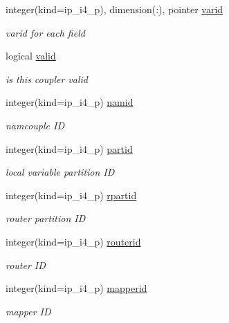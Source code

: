 \begin{DoxyCompactItemize}
integer(kind=ip\+\_\+i4\+\_\+p), dimension(\+:), pointer \hyperlink{structmod__oasis__coupler_1_1prism__coupler__type_a9e31592685ea4cb2da222187ee2ffa4b}{varid}
\begin{DoxyCompactList}\small\item\em varid for each field \end{DoxyCompactList}\item 
logical \hyperlink{structmod__oasis__coupler_1_1prism__coupler__type_aceee78ca0ec709406b404ff29e1fcf18}{valid}
\begin{DoxyCompactList}\small\item\em is this coupler valid \end{DoxyCompactList}\item 
integer(kind=ip\+\_\+i4\+\_\+p) \hyperlink{structmod__oasis__coupler_1_1prism__coupler__type_a68ccbd8305f8c1016a9025558ab8dea5}{namid}
\begin{DoxyCompactList}\small\item\em namcouple ID \end{DoxyCompactList}\item 
integer(kind=ip\+\_\+i4\+\_\+p) \hyperlink{structmod__oasis__coupler_1_1prism__coupler__type_a5506dc46a0c8def7417a6e2a9c046474}{partid}
\begin{DoxyCompactList}\small\item\em local variable partition ID \end{DoxyCompactList}\item 
integer(kind=ip\+\_\+i4\+\_\+p) \hyperlink{structmod__oasis__coupler_1_1prism__coupler__type_a1bf4a986a745318b93d46612b95b0489}{rpartid}
\begin{DoxyCompactList}\small\item\em router partition ID \end{DoxyCompactList}\item 
integer(kind=ip\+\_\+i4\+\_\+p) \hyperlink{structmod__oasis__coupler_1_1prism__coupler__type_ab6ce21d836e3fc511fcb028f99b0abd7}{routerid}
\begin{DoxyCompactList}\small\item\em router ID \end{DoxyCompactList}\item 
integer(kind=ip\+\_\+i4\+\_\+p) \hyperlink{structmod__oasis__coupler_1_1prism__coupler__type_ada880a13e931db47e72859515208ec1d}{mapperid}
\begin{DoxyCompactList}\small\item\em mapper ID \end{DoxyCompactList}\item 

\end{DoxyCompactItemize}
